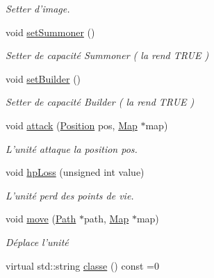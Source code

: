 \begin{DoxyCompactItemize}
\begin{DoxyCompactList}\small\item\em Setter d'image. \end{DoxyCompactList}\item 
\hypertarget{classUnit_a9a35240ea4ccd698e65e4b466344a2cf}{void \hyperlink{classUnit_a9a35240ea4ccd698e65e4b466344a2cf}{set\+Summoner} ()}\label{classUnit_a9a35240ea4ccd698e65e4b466344a2cf}

\begin{DoxyCompactList}\small\item\em Setter de capacité Summoner ( la rend T\+R\+U\+E ) \end{DoxyCompactList}\item 
\hypertarget{classUnit_a9be2e7f4127fb29d7165f4f108a1e095}{void \hyperlink{classUnit_a9be2e7f4127fb29d7165f4f108a1e095}{set\+Builder} ()}\label{classUnit_a9be2e7f4127fb29d7165f4f108a1e095}

\begin{DoxyCompactList}\small\item\em Setter de capacité Builder ( la rend T\+R\+U\+E ) \end{DoxyCompactList}\item 
void \hyperlink{classUnit_ac06b8f6e30f851f15a42d8a1d951034a}{attack} (\hyperlink{classPosition}{Position} pos, \hyperlink{classMap}{Map} $\ast$map)
\begin{DoxyCompactList}\small\item\em L'unité attaque la position pos. \end{DoxyCompactList}\item 
void \hyperlink{classUnit_a3090f43e2ee6a08587a160afaa26e7cd}{hp\+Loss} (unsigned int value)
\begin{DoxyCompactList}\small\item\em L'unité perd des points de vie. \end{DoxyCompactList}\item 
void \hyperlink{classUnit_a8c6bfbaf9bf204baec6ba3c11468ec2f}{move} (\hyperlink{classPath}{Path} $\ast$path, \hyperlink{classMap}{Map} $\ast$map)
\begin{DoxyCompactList}\small\item\em Déplace l'unité \end{DoxyCompactList}\item 
\hypertarget{classUnit_adac07557f9c0b9005709c62263625c2d}{virtual std\+::string \hyperlink{classUnit_adac07557f9c0b9005709c62263625c2d}{classe} () const =0}\label{classUnit_adac07557f9c0b9005709c62263625c2d}


\end{DoxyCompactItemize}
